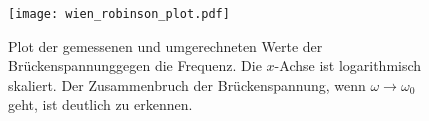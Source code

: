 \begin{figure}
  \centering
  \texttt{[image: wien\_robinson\_plot.pdf]}
  \caption{Plot der gemessenen und umgerechneten Werte der
    Brückenspannunggegen die Frequenz. Die $x$-Achse ist logarithmisch
    skaliert. Der Zusammenbruch der Brückenspannung, wenn
    $\omega\to\omega_0$ geht, ist deutlich zu erkennen.}
  \label{fig:wien_robinson_plot}
\end{figure}

\FloatBarrier

